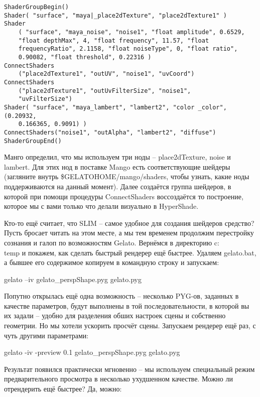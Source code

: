 \begin{lstlisting}[frame=single, framerule=0pt, framesep=10pt, xleftmargin=10pt, xrightmargin=10pt]
ShaderGroupBegin()
Shader( "surface", "maya|_place2dTexture", "place2dTexture1" )
Shader
    ( "surface", "maya_noise", "noise1", "float amplitude", 0.6529,
    "float depthMax", 4, "float frequency", 11.57, "float
    frequencyRatio", 2.1158, "float noiseType", 0, "float ratio",
    0.90082, "float threshold", 0.22316 )
ConnectShaders
    ("place2dTexture1", "outUV", "noise1", "uvCoord")
ConnectShaders
    ("place2dTexture1", "outUvFilterSize", "noise1",
    "uvFilterSize")
Shader( "surface", "maya_lambert", "lambert2", "color _color", (0.20932,
    0.166365, 0.9091) )
ConnectShaders("noise1", "outAlpha", "lambert2", "diffuse")
ShaderGroupEnd()
\end{lstlisting}
  

 Манго определил, что мы используем три ноды –
    place2dTexture, noise и lambert. Для этих нод в поставке Mango есть
    соответствующие шейдеры (загляните внутрь
    \$GELATOHOME/mango/shaders, чтобы узнать, какие ноды поддерживаются
    на данный момент). Далее создаётся группа шейдеров, в которой при
    помощи процедуры ConnectShaders воссоздаётся то построение, которое
    мы с вами только что делали визуально в HyperShade.
  

 Кто-то ещё считает, что SLIM – самое
    удобное для создания шейдеров средство? Пусть бросает читать на
    этом месте, а мы тем временем продолжим перестройку сознания и
    галоп по возможностям Gelato. Вернёмся в директорию c:\\temp и
    покажем, как сделать быстрый рендерер ещё быстрее. Удаляем
    gelato.bat, а бывшее его содержимое копируем в командную строку и
    запускаем:
  

gelato –iv gelato\_perspShape.pyg gelato.pyg
  

 Попутно открылась ещё одна возможность – несколько
    PYG-ов, заданных в качестве параметров, будут выполнены в той
    последовательности, в которой вы их задали – удобно для разделения
    обших настроек сцены и собственно геометрии. Но мы хотели ускорить
    просчёт сцены. Запускаем рендерер ещё раз, с чуть другими
    параметрами:
  

gelato
    -iv -preview 0.1 gelato\_perspShape.pyg gelato.pyg
  

 Результат появился практически мгновенно – мы
    используем специальный режим предварительного просмотра в несколько
    ухудшенном качестве. Можно ли отрендерить ещё быстрее? Да,
    можно:
  


